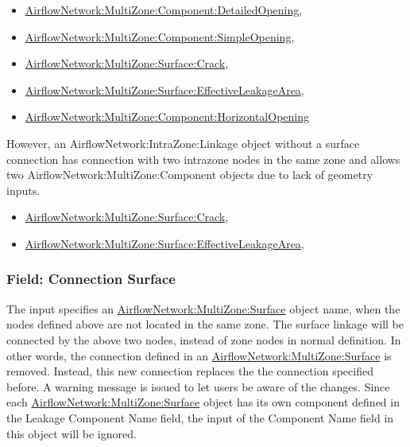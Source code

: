 \begin{itemize}
\tightlist
\item
  \hyperref[airflownetworkmultizonecomponentdetailedopening]{AirflowNetwork:MultiZone:Component:DetailedOpening},
\item
  \hyperref[airflownetworkmultizonecomponentsimpleopening]{AirflowNetwork:MultiZone:Component:SimpleOpening},
\item
  \hyperref[airflownetworkmultizonesurfacecrack]{AirflowNetwork:MultiZone:Surface:Crack},
\item
  \hyperref[airflownetworkmultizonesurfaceeffectiveleakagearea]{AirflowNetwork:MultiZone:Surface:EffectiveLeakageArea},
\item
  \hyperref[airflownetworkmultizonecomponenthorizontalopening]{AirflowNetwork:MultiZone:Component:HorizontalOpening}
\end{itemize}

However, an AirflowNetwork:IntraZone:Linkage object without a surface connection has connection with two intrazone nodes in the same zone and allows two AirflowNetwork:MultiZone:Component objects due to lack of geometry inputs.

\begin{itemize}
\tightlist
\item
  \hyperref[airflownetworkmultizonesurfacecrack]{AirflowNetwork:MultiZone:Surface:Crack},
\item
  \hyperref[airflownetworkmultizonesurfaceeffectiveleakagearea]{AirflowNetwork:MultiZone:Surface:EffectiveLeakageArea},
\end{itemize}

\subsubsection{Field: Connection Surface}\label{field-connection-surface}

The input specifies an \hyperref[airflownetworkmultizonesurface]{AirflowNetwork:MultiZone:Surface} object name, when the nodes defined above are not located in the same zone. The surface linkage will be connected by the above two nodes, instead of zone nodes in normal definition. In other words, the connection defined in an \hyperref[airflownetworkmultizonesurface]{AirflowNetwork:MultiZone:Surface} is removed. Instead, this new connection replaces the the connection specified before. A warning message is issued to let users be aware of the changes. Since each \hyperref[airflownetworkmultizonesurface]{AirflowNetwork:MultiZone:Surface} object has its own component defined in the Leakage Component Name field, the input of the Component Name field in this object will be ignored.

